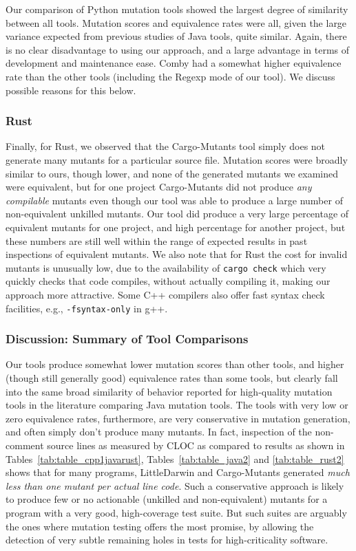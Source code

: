 \documentclass[sigconf,review, anonymous]{acmart}
\begin{document}
{Our comparison of Python mutation tools showed the largest degree of
similarity between all tools.  Mutation scores and equivalence rates
were all, given the large variance expected from previous studies of
Java tools, quite similar.  Again, there is no clear disadvantage to
using our approach, and a large advantage in terms of development and
maintenance ease.  Comby had a somewhat higher equivalence rate than the
other tools (including the Regexp mode of our tool).  We discuss
possible reasons for this below.

\subsubsection{Rust}

Finally, for Rust, we observed that the Cargo-Mutants tool simply does
not generate many mutants for a particular source file.  Mutation scores were broadly similar to
ours, though lower, and none of the generated mutants we examined were
equivalent, but for one project Cargo-Mutants did not produce
\emph{any compilable} mutants even though our tool was able to produce a large
number of non-equivalent unkilled mutants.  Our tool did produce a
very large percentage of equivalent mutants for one project, and high
percentage for another project, but these numbers are still well
within the range of expected results in past inspections of
equivalent mutants.  We also note  that for Rust the cost for invalid
mutants is unusually low, due to the availability of {\tt cargo check}
which very quickly checks that code compiles, without actually
compiling it, making our approach more attractive.  Some C++ compilers
also offer fast syntax check facilities, e.g., {\tt -fsyntax-only} in g++.

\subsubsection{Discussion: Summary of Tool Comparisons}

Our tools produce somewhat lower mutation scores than other tools, and
higher (though still generally good) equivalence rates than some
tools, but clearly fall into the same broad similarity of behavior
reported for high-quality mutation tools in the literature comparing
Java mutation tools.   The tools with very low or zero equivalence rates, furthermore,
are very conservative in mutation generation, and often simply don't
produce many mutants.  In fact, inspection of the non-comment source
lines as measured by CLOC as compared to results as shown in Tables~\ref{tab:table_cpp1javarust},
Tables~\ref{tab:table_java2} and 
\ref{tab:table_rust2} shows that for many programs, LittleDarwin and
Cargo-Mutants generated \emph{much less than one mutant per actual
  line code}.  Such a conservative approach is likely to produce few
or no actionable (unkilled and non-equivalent) mutants for a program
with a very good, high-coverage test suite.  But such suites are
arguably the ones where mutation testing offers the most promise, by
allowing the detection of very subtle remaining holes in tests for
high-criticality software.

}
\end{document}
